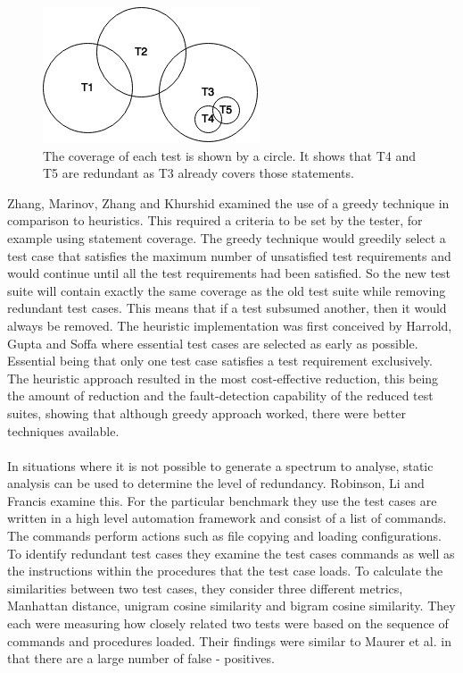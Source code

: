 \begin{figure}[h]
\begin{center}
\includegraphics[]{VennDiagram.png}
\end{center}
\caption{The coverage of each test is shown by a circle. It shows that T4 and T5 are redundant as T3 already covers those statements.}
\label{fig:venndiagram}
\end{figure}

Zhang, Marinov, Zhang and Khurshid \cite{zhang2011empirical} examined the use of a greedy technique in comparison to heuristics. This required a criteria to be set by the tester, for example using statement coverage. The greedy technique would greedily select a test case that satisfies the maximum number of unsatisfied test requirements and would continue until all the test requirements had been satisfied. So the new test suite will contain exactly the same coverage as the old test suite while removing redundant test cases. This means that if a test subsumed another, then it would always be removed. The heuristic implementation was first conceived by Harrold, Gupta and Soffa \cite{harrold1993methodology} where essential test cases are selected as early as possible. Essential being that only one test case satisfies a test requirement exclusively. The heuristic approach resulted in the most cost-effective reduction, this being the amount of reduction and the fault-detection capability of the reduced test suites, showing that although greedy approach worked, there were better techniques available.
\paragraph{}
In situations where it is not possible to generate a spectrum to analyse, static analysis can be used to determine the level of redundancy. Robinson, Li and Francis \cite{li2008static} examine this. For the particular benchmark they use the test cases are written in a high level automation framework and consist of a list of commands. The commands perform actions such as file copying and loading configurations. To identify redundant test cases they examine the test cases commands as well as the instructions within the procedures that the test case loads. To calculate the similarities between two test cases, they consider three different metrics, Manhattan distance, unigram cosine similarity and bigram cosine similarity. They each were measuring how closely related two tests were based on the sequence of commands and procedures loaded. Their findings were similar to Maurer et al. \cite{koochakzadeh2009test} in that there are a large number of false - positives.
